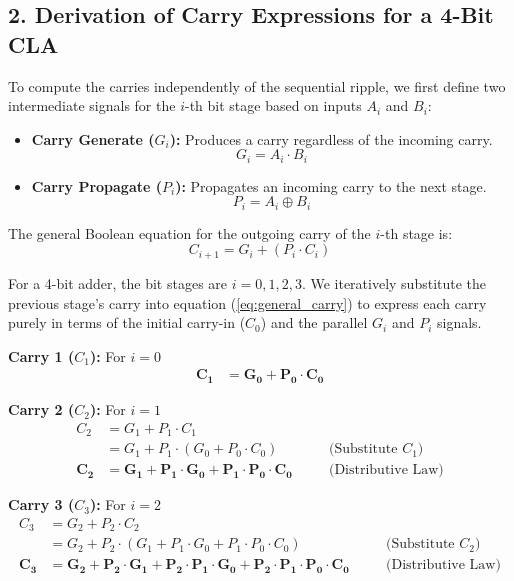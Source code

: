 \documentclass[12pt,a3paper]{article}
\begin{document}
\begin{enumerate}
\begin{tcolorbox}[enhanced,breakable,ansbox,colback=cD!4,colframe=cD,boxrule=0.8pt,arc=5pt,title={\textbf{Answer}},fonttitle=\bfseries\color{white},colbacktitle=cD]
\vspace{1em}
\subsection*{2. Derivation of Carry Expressions for a 4-Bit CLA}

To compute the carries independently of the sequential ripple, we first define two intermediate signals for the $i$-th bit stage based on inputs $A_i$ and $B_i$:
\begin{itemize}
    \item \textbf{Carry Generate ($G_i$):} Produces a carry regardless of the incoming carry. 
    \[ G_i = A_i \cdot B_i \]
    \item \textbf{Carry Propagate ($P_i$):} Propagates an incoming carry to the next stage.
    \[ P_i = A_i \oplus B_i \]
\end{itemize}

The general Boolean equation for the outgoing carry of the $i$-th stage is:
\begin{equation}
    C_{i+1} = G_i + (P_i \cdot C_i) \label{eq:general_carry}
\end{equation}

For a 4-bit adder, the bit stages are $i = 0, 1, 2, 3$. We iteratively substitute the previous stage's carry into equation (\ref{eq:general_carry}) to express each carry purely in terms of the initial carry-in ($C_0$) and the parallel $G_i$ and $P_i$ signals.

\vspace{0.5em}
\textbf{Carry 1 ($C_1$):} For $i = 0$
\begin{align*}
    \mathbf{C_1} &= \mathbf{G_0 + P_0 \cdot C_0}
\end{align*}

\vspace{0.5em}
\textbf{Carry 2 ($C_2$):} For $i = 1$
\begin{align*}
    C_2 &= G_1 + P_1 \cdot C_1 \\
    &= G_1 + P_1 \cdot (G_0 + P_0 \cdot C_0) \quad &&\text{(Substitute } C_1\text{)} \\
    \mathbf{C_2} &= \mathbf{G_1 + P_1 \cdot G_0 + P_1 \cdot P_0 \cdot C_0} \quad &&\text{(Distributive Law)}
\end{align*}

\vspace{0.5em}
\textbf{Carry 3 ($C_3$):} For $i = 2$
\begin{align*}
    C_3 &= G_2 + P_2 \cdot C_2 \\
    &= G_2 + P_2 \cdot (G_1 + P_1 \cdot G_0 + P_1 \cdot P_0 \cdot C_0) \quad &&\text{(Substitute } C_2\text{)} \\
    \mathbf{C_3} &= \mathbf{G_2 + P_2 \cdot G_1 + P_2 \cdot P_1 \cdot G_0 + P_2 \cdot P_1 \cdot P_0 \cdot C_0} \quad &&\text{(Distributive Law)}
\end{align*}


\end{tcolorbox}
\end{enumerate}
\end{document}
